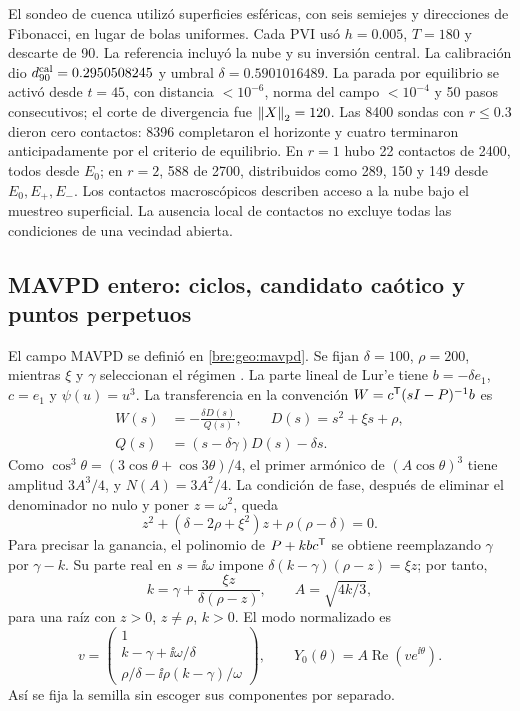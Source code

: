 El sondeo de cuenca utilizó superficies esféricas, con seis semiejes y
direcciones de Fibonacci, en lugar de bolas uniformes. Cada PVI usó
\(h=0.005\), \(T=180\) y descarte de 90. La referencia incluyó la nube y
su inversión central. La calibración dio
\(d_{90}^{\rm cal}=0.2950508245\) y umbral
\(\delta=0.5901016489\). La parada por equilibrio se activó desde
\(t=45\), con distancia \(<10^{-6}\), norma del campo \(<10^{-4}\) y
50 pasos consecutivos; el corte de divergencia fue \(\left\lVert X\right\rVert_2=120\).
Las 8400 sondas con \(r\leq0.3\) dieron cero contactos: 8396 completaron el
horizonte y cuatro terminaron anticipadamente por el criterio de equilibrio.
En \(r=1\) hubo 22 contactos de 2400, todos desde \(E_0\); en \(r=2\),
588 de 2700, distribuidos como 289, 150 y 149 desde \(E_0,E_+,E_-\).
Los contactos macroscópicos describen acceso a la nube bajo el muestreo
superficial. La ausencia local de contactos no excluye todas las condiciones
de una vecindad abierta.

\subsection{MAVPD entero: ciclos, candidato caótico y puntos perpetuos}
\label{bre:res:mavpd}

El campo MAVPD se definió en \eqref{bre:geo:mavpd}. Se fijan
\(\delta=100\), \(\rho=200\), mientras \(\xi\) y \(\gamma\) seleccionan el
régimen \cite{matouk2023}. La parte lineal de Lur'e tiene
\(b=-\delta e_1\), \(c=e_1\) y \(\psi(u)=u^3\). La transferencia en la
convención \(W=c^{\mathsf T}(sI-P)^{-1}b\) es
\begin{equation}
 \begin{aligned}
 W(s)&=-\frac{\delta D(s)}{Q(s)},\qquad D(s)=s^2+\xi s+\rho,\\
 Q(s)&=(s-\delta\gamma)D(s)-\delta s.
 \end{aligned}
 \label{bre:res:mavpd-transfer}
\end{equation}
Como \(\cos^3\theta=(3\cos\theta+\cos3\theta)/4\), el primer armónico de
\((A\cos\theta)^3\) tiene amplitud \(3A^3/4\), y
\(N(A)=3A^2/4\). La condición de fase, después de eliminar el denominador
no nulo y poner \(z=\omega^2\), queda
\begin{equation}
 z^2+(\delta-2\rho+\xi^2)z+\rho(\rho-\delta)=0.
 \label{bre:res:mavpd-frequency}
\end{equation}
Para precisar la ganancia, el polinomio de \(P+kbc^{\mathsf T}\) se obtiene
reemplazando \(\gamma\) por \(\gamma-k\). Su parte real en
\(s=\ii\omega\) impone
\(\delta(k-\gamma)(\rho-z)=\xi z\); por tanto,
\[
 k=\gamma+\frac{\xi z}{\delta(\rho-z)},\qquad
 A=\sqrt{4k/3},
\]
para una raíz con \(z>0\), \(z\ne\rho\), \(k>0\). El modo normalizado es
\[
 v=\begin{pmatrix}
 1\\ k-\gamma+\ii\omega/\delta\\
 \rho/\delta-\ii\rho(k-\gamma)/\omega
 \end{pmatrix},\qquad Y_0(\theta)=A\operatorname{Re}(v e^{\ii\theta}).
\]
Así se fija la semilla sin escoger sus componentes por separado.

